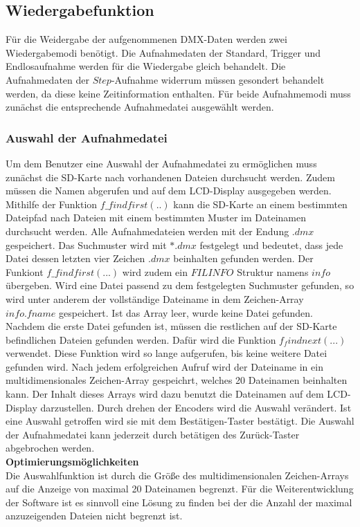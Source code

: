 
\subsection{Wiedergabefunktion}
Für die Weidergabe der aufgenommenen DMX-Daten werden zwei Wiedergabemodi benötigt. Die Aufnahmedaten der Standard, Trigger und Endlosaufnahme werden für die Wiedergabe gleich behandelt. Die Aufnahmedaten der $Step$-Aufnahme widerrum müssen gesondert behandelt werden, da diese keine Zeitinformation enthalten. Für beide Aufnahmemodi muss zunächst die entsprechende Aufnahmedatei ausgewählt werden.

\subsubsection{Auswahl der Aufnahmedatei}
\label{sec:selectfile}
Um dem Benutzer eine Auswahl der Aufnahmedatei zu ermöglichen muss zunächst die SD-Karte nach vorhandenen Dateien durchsucht werden. Zudem müssen die Namen abgerufen und auf dem LCD-Display ausgegeben werden. Mithilfe der Funktion $f\_findfirst(..)$ kann die SD-Karte an einem bestimmten Dateipfad nach Dateien mit einem bestimmten Muster im Dateinamen durchsucht werden. Alle Aufnahmedateien werden mit der Endung $.dmx$ gespeichert. Das Suchmuster wird mit $*.dmx$ festgelegt und bedeutet, dass jede Datei dessen letzten vier Zeichen $.dmx$ beinhalten gefunden werden. Der Funkiont $f\_findfirst(...)$ wird zudem ein $FILINFO$ Struktur namens $info$ übergeben. Wird eine Datei passend zu dem festgelegten Suchmuster gefunden, so wird unter anderem der vollständige Dateiname in dem Zeichen-Array $info.fname$ gespeichert. Ist das Array leer, wurde keine Datei gefunden. Nachdem die erste Datei gefunden ist, müssen die restlichen auf der SD-Karte befindlichen Dateien gefunden werden. Dafür wird die Funktion $f_findnext(...)$ verwendet. Diese Funktion wird so lange aufgerufen, bis keine weitere Datei gefunden wird. Nach jedem erfolgreichen Aufruf wird der Dateiname in ein multidimensionales Zeichen-Array gespeichrt, welches 20 Dateinamen beinhalten kann. Der Inhalt dieses Arrays wird dazu benutzt die Dateinamen auf dem LCD-Display darzustellen. Durch drehen der Encoders wird die Auswahl verändert. Ist eine Auswahl getroffen wird sie mit dem Bestätigen-Taster bestätigt. Die Auswahl der Aufnahmedatei kann jederzeit durch betätigen des Zurück-Taster abgebrochen werden.\\
\newline
\textbf{Optimierungsmöglichkeiten}\\
Die Auswahlfunktion ist durch die Größe des multidimensionalen Zeichen-Arrays auf die Anzeige von maximal 20 Dateinamen begrenzt. Für die Weiterentwicklung der Software ist es sinnvoll eine Lösung zu finden bei der die Anzahl der maximal anzuzeigenden Dateien nicht begrenzt ist.

